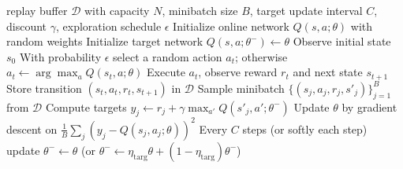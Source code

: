 \begin{algorithm}[!htbp]
\caption{Deep Q-Network (DQN) --- training loop \cite{Mnih2015}}
\label{alg:dqn}
\begin{algorithmic}
\REQUIRE replay buffer $\mathcal{D}$ with capacity $N$, minibatch size $B$, target update interval $C$, discount $\gamma$, exploration schedule $\epsilon$
\STATE Initialize online network $Q(s,a;\theta)$ with random weights
\STATE Initialize target network $Q(s,a;\theta^-) \leftarrow \theta$
    \STATE Observe initial state $s_0$
        \STATE With probability $\epsilon$ select a random action $a_t$; otherwise $a_t \leftarrow \arg\max_a Q(s_t, a; \theta)$
        \STATE Execute $a_t$, observe reward $r_t$ and next state $s_{t+1}$
        \STATE Store transition $(s_t, a_t, r_t, s_{t+1})$ in $\mathcal{D}$
        \STATE Sample minibatch $\{(s_j, a_j, r_j, s'_j)\}_{j=1}^{B}$ from $\mathcal{D}$
        \STATE Compute targets $y_j \leftarrow r_j + \gamma \max_{a'} Q(s'_j, a'; \theta^-)$
        \STATE Update $\theta$ by gradient descent on $\frac{1}{B}\sum_j (y_j - Q(s_j, a_j; \theta))^2$
        \STATE Every $C$ steps (or softly each step) update $\theta^- \leftarrow \theta$ (or $\theta^- \leftarrow \eta_{\mathrm{targ}}\theta + (1-\eta_{\mathrm{targ}})\theta^-$)
    \ENDFOR
\ENDFOR
\end{algorithmic}
\end{algorithm}

